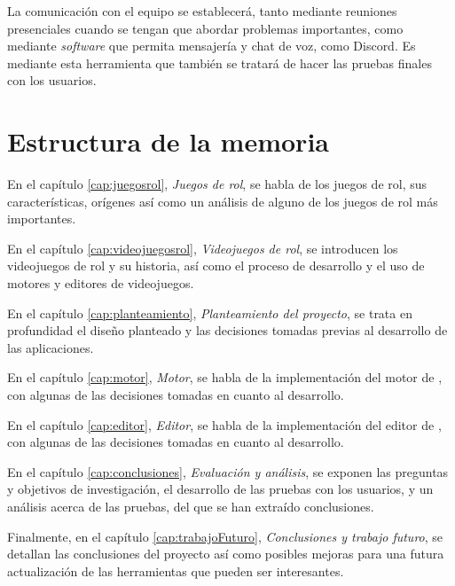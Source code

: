 \medskip

La comunicación con el equipo se establecerá, tanto mediante reuniones presenciales cuando se tengan que abordar problemas importantes, como mediante \textit{software} que permita mensajería y chat de voz, como Discord. Es mediante esta herramienta que también se tratará de hacer las pruebas finales con los usuarios.

\section{Estructura de la memoria} 
En el capítulo \ref{cap:juegosrol}, \textit{Juegos de rol}, se habla de los juegos de rol, sus características, orígenes así como un análisis de alguno de los juegos de rol más importantes.

\medskip

En el capítulo \ref{cap:videojuegosrol}, \textit{Videojuegos de rol}, se introducen los videojuegos de rol y su historia, así como el proceso de desarrollo y el uso de motores y editores de videojuegos.

\medskip

En el capítulo \ref{cap:planteamiento}, \textit{Planteamiento del proyecto}, se trata en profundidad el diseño planteado y las decisiones tomadas previas al desarrollo de las aplicaciones.

\medskip

En el capítulo \ref{cap:motor}, \textit{Motor}, se habla de la implementación del motor de \baker, con algunas de las decisiones tomadas en cuanto al desarrollo.

\medskip

En el capítulo \ref{cap:editor}, \textit{Editor}, se habla de la implementación del editor de \baker, con algunas de las decisiones tomadas en cuanto al desarrollo.

\medskip

En el capítulo \ref{cap:conclusiones}, \textit{Evaluación y análisis}, se exponen las preguntas y objetivos de investigación, el desarrollo de las pruebas con los usuarios, y un análisis acerca de las pruebas, del que se han extraído conclusiones.

\medskip

Finalmente, en el capítulo \ref{cap:trabajoFuturo}, \textit{Conclusiones y trabajo futuro}, se detallan las conclusiones del proyecto así como posibles mejoras para una futura actualización de las herramientas que pueden ser interesantes.